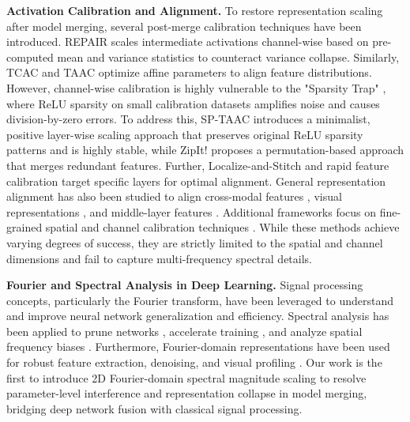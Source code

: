 \documentclass{article}
\begin{document}
\textbf{Activation Calibration and Alignment.} To restore representation scaling after model merging, several post-merge calibration techniques have been introduced. REPAIR \citep{jordan2022re} scales intermediate activations channel-wise based on pre-computed mean and variance statistics to counteract variance collapse. Similarly, TCAC and TAAC optimize affine parameters to align feature distributions. However, channel-wise calibration is highly vulnerable to the "Sparsity Trap" \citep{submission3}, where ReLU sparsity on small calibration datasets amplifies noise and causes division-by-zero errors. To address this, SP-TAAC \citep{submission8} introduces a minimalist, positive layer-wise scaling approach that preserves original ReLU sparsity patterns and is highly stable, while ZipIt! \citep{stoica2024zipit} proposes a permutation-based approach that merges redundant features. Further, Localize-and-Stitch \citep{He2024LocalizeandStitchEM} and rapid feature calibration \citep{Samimi2016ProposeAM} target specific layers for optimal alignment. General representation alignment has also been studied to align cross-modal features \citep{Yu2024RepresentationAF}, visual representations \citep{Yoon2025VisualRA, Lin2023VideoLLaVALU}, and middle-layer features \citep{Liu2025MiddleLayerRA, Tjandrasuwita2025UnderstandingTE}. Additional frameworks focus on fine-grained spatial and channel calibration techniques \citep{Ma2023FineCM, Wu2023RapidSF, Shuai2023RapidDO, Luo2024PrinciplesAA}. While these methods achieve varying degrees of success, they are strictly limited to the spatial and channel dimensions and fail to capture multi-frequency spectral details.

\textbf{Fourier and Spectral Analysis in Deep Learning.} Signal processing concepts, particularly the Fourier transform, have been leveraged to understand and improve neural network generalization and efficiency. Spectral analysis has been applied to prune networks \citep{Suzuki2018SpectralPruningCD}, accelerate training \citep{Sun2025DeepGFTIS, Seo2025DeepLR}, and analyze spatial frequency biases \citep{Wang2024DeepLR, Reddy2024EnhancingPA}. Furthermore, Fourier-domain representations have been used for robust feature extraction, denoising, and visual profiling \citep{Singh2025WhatMF, Li2025SpatialFI, Kerby2021MultiwavelengthSA, Sahiner2020GammaSA}. Our work is the first to introduce 2D Fourier-domain spectral magnitude scaling to resolve parameter-level interference and representation collapse in model merging, bridging deep network fusion with classical signal processing.
\end{document}
